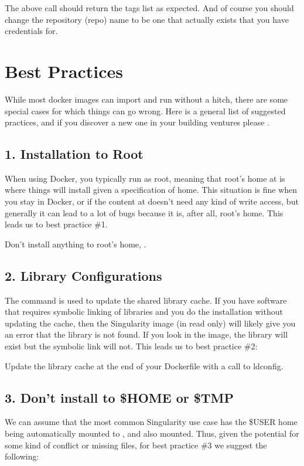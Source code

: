 \documentclass[letterpaper,10pt,english]{sphinxmanual}
\begin{document}
The above call should return the tags list as expected. And of course
you should change the repository (repo) name to be one that actually exists that you
have credentials for.


\section{Best Practices}
\label{\detokenize{singularity_and_docker:best-practices}}
While most docker images can import and run without a hitch, there are
some special cases for which things can go wrong. Here is a general list
of suggested practices, and if you discover a new one in your building
ventures please .


\subsection{1. Installation to Root}
\label{\detokenize{singularity_and_docker:installation-to-root}}
When using Docker, you typically run as root, meaning that root’s home
at  is where things will install given a specification of home. This situation is
fine when you stay in Docker, or if the content at  doesn’t need any
kind of write access, but generally it can lead to a lot of bugs because
it is, after all, root’s home. This leads us to best practice \#1.

Don’t install anything to root’s home, .


\subsection{2. Library Configurations}
\label{\detokenize{singularity_and_docker:library-configurations}}
The command  is used to update the shared library cache. If
you have software that requires symbolic linking of libraries and you
do the installation without updating the cache, then the Singularity
image (in read only) will likely give you an error that the library is
not found. If you look in the image, the library will exist but the
symbolic link will not. This leads us to best practice \#2:

Update the library cache at the end of your Dockerfile with a call
to ldconfig.


\subsection{3. Don’t install to \$HOME or \$TMP}
\label{\detokenize{singularity_and_docker:don-t-install-to-home-or-tmp}}
We can assume that the most common Singularity use case has the \$USER
home being automatically mounted to , and  also mounted. Thus, given
the potential for some kind of conflict or missing files, for best
practice \#3 we suggest the following:
\end{document}
